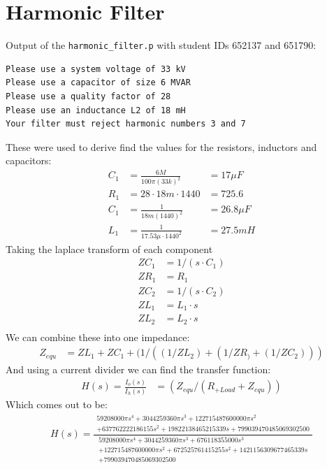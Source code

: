 \documentclass[11pt]{article}
\begin{document}
\section{Harmonic Filter}
\label{sec:org6411159}
Output of the \texttt{harmonic\_filter.p} with student IDs 652137 and 651790:
\begin{verbatim}
Please use a system voltage of 33 kV
Please use a capacitor of size 6 MVAR
Please use a quality factor of 28
Please use an inductance L2 of 18 mH
Your filter must reject harmonic numbers 3 and 7
\end{verbatim}
These were used to derive find the values for the resistors, inductors and capacitors:
\begin{align*}
C_1&=\frac{6M}{100\pi(33k)^2}&=17\mu F \\
R_1&=28\cdot 18m\cdot 1440 &= 725.6 \\
C_1&=\frac{1}{18m(1440)^2}&=26.8\mu F \\
L_1&=\frac{1}{17.53\mu\cdot 1440^2}&=27.5mH
\end{align*}
Taking the laplace transform of each component
\begin{align*}
ZC_1&=1/(s\cdot C_1) \\
ZR_1&=R_1 \\
ZC_2&=1/(s\cdot C_2) \\
ZL_1&=L_1\cdot s \\
ZL_2&=L_2\cdot s \\
\end{align*}
We can combine these into one impedance:
\begin{align*}
Z_{equ}&=ZL_1+ZC_1+(1/((1/ZL_2)+(1/ZR_)+(1/ZC_2)))
\end{align*}
And using a current divider we can find the transfer function:
\begin{align*}
H(s)=\frac{I_o(s)}{I_h(s)} &= (Z_{equ}/(R_{+Load}+Z_{equ}))
\end{align*}
Which comes out to be:
\begin{align*}
H(s) = \frac{
\begin{array}{c}
    59208000 \pi s^{4} + 3044259360 \pi s^{3} + 122715487600000 \pi s^{2} \\
    + 637762222186155 s^{2} + 19822138465215339 s + 799039470485069302500
    \end{array}}{
    \begin{array}{c}
    59208000 \pi s^{4} + 3044259360 \pi s^{3} + 676118355000 s^{3} \\
    + 122715487600000 \pi s^{2} + 672525761415255 s^{2} + 1421156309677465339 s \\
    + 799039470485069302500
\end{array}}
\end{align*}
\end{document}
